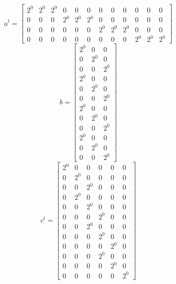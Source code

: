 \documentclass{article}%
\begin{document}
\[%
a^{t} = \left[\begin{array}{cccccccccccc}2^{0} & 2^{0} & 2^{0} & 0 & 0 & 0 & 0 & 0 & 0 & 0 & 0 & 0\\0 & 0 & 0 & 2^{0} & 2^{0} & 2^{0} & 0 & 0 & 0 & 0 & 0 & 0\\0 & 0 & 0 & 0 & 0 & 0 & 2^{0} & 2^{0} & 2^{0} & 0 & 0 & 0\\0 & 0 & 0 & 0 & 0 & 0 & 0 & 0 & 0 & 2^{0} & 2^{0} & 2^{0}\end{array}\right]%
\]%
\[%
b = \left[\begin{matrix}2^{0} & 0 & 0\\0 & 2^{0} & 0\\0 & 0 & 2^{0}\\2^{0} & 0 & 0\\0 & 2^{0} & 0\\0 & 0 & 2^{0}\\2^{0} & 0 & 0\\0 & 2^{0} & 0\\0 & 0 & 2^{0}\\2^{0} & 0 & 0\\0 & 2^{0} & 0\\0 & 0 & 2^{0}\end{matrix}\right]%
\]%
\[%
c^{t} = \left[\begin{matrix}2^{0} & 0 & 0 & 0 & 0 & 0\\0 & 2^{0} & 0 & 0 & 0 & 0\\0 & 0 & 2^{0} & 0 & 0 & 0\\0 & 2^{0} & 0 & 0 & 0 & 0\\0 & 0 & 2^{0} & 0 & 0 & 0\\0 & 0 & 0 & 2^{0} & 0 & 0\\0 & 0 & 2^{0} & 0 & 0 & 0\\0 & 0 & 0 & 2^{0} & 0 & 0\\0 & 0 & 0 & 0 & 2^{0} & 0\\0 & 0 & 0 & 2^{0} & 0 & 0\\0 & 0 & 0 & 0 & 2^{0} & 0\\0 & 0 & 0 & 0 & 0 & 2^{0}\end{matrix}\right]%
\]%
\end{document}
